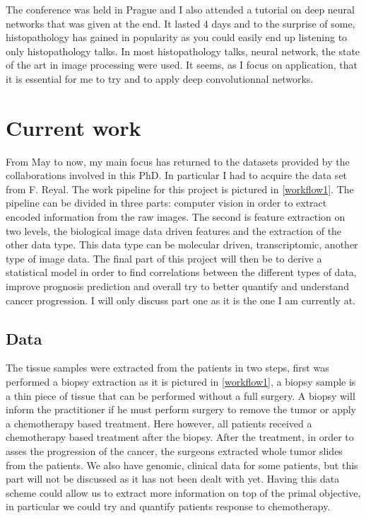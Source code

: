 \documentclass[a4paper,10pt]{article}
\begin{document}
The conference was held in Prague and I also attended a tutorial on
deep neural networks that was given at the end. It lasted 4 days and
to the surprise of some, histopathology has gained in popularity as
you could easily end up listening to only histopathology talks. In
most histopathology talks, neural network, the state of the art in
image processing were used. It seems, as I focus on application, that
it is essential for me to try and to apply deep convolutionnal
networks. 


\section{Current work}
From May to now, my main focus has returned to the datasets provided
by the collaborations involved in this PhD. In particular I had to
acquire the data set from F. Reyal. The work pipeline for this project
is pictured in \ref{workflow1}. The pipeline can be divided in three
parts: computer vision in order to extract encoded information from
the raw images. The second is feature extraction on two levels, the
biological image data driven features and the extraction of the other
data type. This data type can be molecular driven, transcriptomic,
another type of image data. The final part of this project will then
be to derive a statistical model in order to find correlations between
the different types of data, improve prognosis prediction and overall
try to better quantify and understand cancer progression. I will only
discuss part one as it is the one I am currently at. 




\subsection{Data}

The tissue samples were extracted from the patients in two steps,
first was performed a biopsy extraction as it is pictured in
\ref{workflow1}, a biopsy sample is a thin piece of tissue that can be
performed without a full surgery. A biopsy will inform the
practitioner if he must perform surgery to remove the tumor or apply a
chemotherapy based treatment. Here however, all patients received a
chemotherapy based treatment after the biopsy. After the treatment, in
order to asses the progression of the cancer, the surgeons extracted
whole tumor slides from the patients. We also have genomic, clinical
data for some patients, but this part will not be discussed as it has
not been dealt with yet. Having this data scheme could allow us to
extract more information on top of the primal objective, in particular
we could try and quantify patients response to chemotherapy. 
\end{document}
